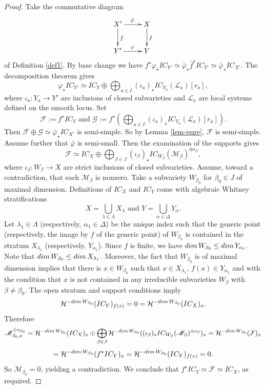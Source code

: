 \documentclass[11pt, reqno]{amsart}
\theoremstyle{plain}
\theoremstyle{definition}
\theoremstyle{remark}
\begin{document}
\begin{proof}
Take the commutative diagram
 $$\xymatrix{
      X'\ar[r]^{\bar{\varphi}} \ar[d] ^{\bar{f}} & X\ar[d]^{f}\\ Y' \ar[r]^{\varphi} & Y }$$ 
 of  Definition \ref{def1}. By base change \cite[Theorem 2.3.26]{Dim04} we have
$f^{\star}\varphi_{\star} IC_{Y'}\simeq \bar{\varphi}_{\star}\bar{f}^{\star} IC_{Y'}\simeq \bar{\varphi}_{\star} IC_{X'}.$
The decomposition theorem gives 
$$\varphi_{\star}IC_{Y'}\simeq IC_{Y}\oplus \bigoplus_{a\in I} (\iota_{a})_{\star}IC_{Y_{a}}(\mathscr{L}_{a})[r_{a}],$$
where $\iota_{a}: Y_{a}\rightarrow Y'$ are inclusions of closed subvarieties and $\mathscr{L}_{a}$ are 
local systems defined on the smooth locus. Set
$$\mathcal{F}:= f^{\star} IC_{Y}\text{ and } \mathcal{G}:=f^{\star}\left( \bigoplus_{a\in I} (\iota_{a})_{\star}IC_{Y_{a}}(\mathscr{L}_{a})[r_{a}]\right).$$
 Then
$\mathcal{F}\oplus \mathcal{G}\simeq \bar{\varphi}_{\star} IC_{X'}$
is semi-simple. So by Lemma \ref{lem-pure}, $\mathcal{F}$ is semi-simple. Assume further that $\bar{\varphi}$ is semi-small.
Then the examination of the supports gives
$$\mathcal{F}\simeq IC_{X}\oplus \bigoplus_{\beta\in J}(\iota_{\beta})_{\star}IC_{W_{\beta}}(\mathscr{M}_{\beta})^{\oplus s_{\beta}},$$
where $\iota_{\beta}:W_{\beta}\rightarrow X$ are strict inclusions of  closed subvarieties. 
Assume, toward a contradiction, that each $\mathscr{M}_{\beta}$ is nonzero.
Take a subvariety $W_{\beta_{0}}$ for $\beta_{0}\in J$ of maximal dimension. Definitions of
$IC_{X}$ and $IC_{Y}$ come with algebraic Whitney stratifications
$$X =  \bigcup_{\lambda \in \Lambda}X_{\lambda}\text{ and } Y =  \bigcup_{\alpha \in \Delta}Y_{\alpha}.$$
Let $\lambda_{1}\in \Lambda$ (respectively, $\alpha_{1}\in \Delta$) be the unique index such that the generic point (respectively,
the image by $f$ of the generic point) of $W_{\beta_{0}}$ is contained in the stratum $X_{\lambda_{1}}$ (respectively, $Y_{\alpha_{1}}$).
Since $f$ is finite, we have ${\rm dim}\, W_{\beta_{0}}\leq {\rm dim}\, Y_{\alpha_{1}}$. Note that ${\rm dim}\, W_{\beta_{0}}\leq {\rm dim}\, X_{\lambda_{1}}$. Moreover, the fact that $W_{\beta_{0}}$ is of maximal dimension implies that there is $x\in W_{\beta_{0}}$ such that $x\in X_{\lambda_{1}}$, $f(x) \in Y_{\alpha_{1}}$ and with the condition that $x$ is not contained in any irreducible subvarieties $W_{\beta}$ with $\beta\neq \beta_{0}$. The open stratum and support conditions imply
$$\mathcal{H}^{-{\rm dim}\, W_{\beta_{0}}}(IC_{Y})_{f(x)} =  0 =  \mathcal{H}^{-{\rm dim}\, W_{\beta_{0}}}(IC_{X})_{x} .$$
Therefore
$$\mathscr{M}_{\beta_{0}, x}^{\oplus s_{\beta_{0}}} =  \mathcal{H}^{-{\rm dim}\, W_{\beta_{0}}}(IC_{X})_{x}\oplus \bigoplus_{\beta\in J} \mathcal{H}^{-{\rm dim}\, W_{\beta_{0}}}((\iota_{\beta})_{\star}IC_{W_{\beta}}(\mathscr{M}_{\beta})^{\oplus s_{\beta}})_{x} =  \mathcal{H}^{-{\rm dim}\, W_{\beta_{0}}}(\mathcal{F})_{x} $$
$$ =  \mathcal{H}^{-{\rm dim}\, W_{\beta_{0}}}(f^{\star}IC_{Y})_{x}  =  \mathcal{H}^{-{\rm dim}\, W_{\beta_{0}}}(IC_{Y})_{f(x)} =  0.$$
So $\mathscr{M}_{\beta_{0}} = 0$, yielding a contradiction. We conclude that $f^{\star} IC_{Y} \simeq \mathcal{F}\simeq IC_{X}$, as required. 
\end{proof}
\end{document}
